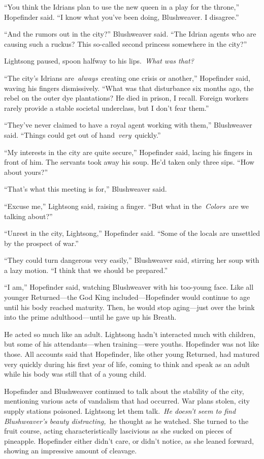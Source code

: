 “You think the Idrians plan to use the new queen in a play for the throne,” Hopefinder said. “I know what you’ve been doing, Blushweaver. I disagree.”

“And the rumors out in the city?” Blushweaver said. “The Idrian agents who are causing such a ruckus? This so-called second princess somewhere in the city?”

Lightsong paused, spoon halfway to his lips.~\textit{What was that?}

“The city’s Idrians are~\textit{always}~creating one crisis or another,” Hopefinder said, waving his fingers dismissively. “What was that disturbance six months ago, the rebel on the outer dye plantations? He died in prison, I recall. Foreign workers rarely provide a stable societal underclass, but I don’t fear them.”

“They’ve never claimed to have a royal agent working with them,” Blushweaver said. “Things could get out of hand~\textit{very}~quickly.”

“My interests in the city are quite secure,” Hopefinder said, lacing his fingers in front of him. The servants took away his soup. He’d taken only three sips. “How about yours?”

“That’s what this meeting is for,” Blushweaver said.

“Excuse me,” Lightsong said, raising a finger. “But what in the~\textit{Colors}~are we talking about?”

“Unrest in the city, Lightsong,” Hopefinder said. “Some of the locals are unsettled by the prospect of war.”

“They could turn dangerous very easily,” Blushweaver said, stirring her soup with a lazy motion. “I think that we should be prepared.”

“I am,” Hopefinder said, watching Blushweaver with his too-young face. Like all younger Returned—the God King included—Hopefinder would continue to age until his body reached maturity. Then, he would stop aging—just over the brink into the prime adulthood—until he gave up his Breath.

He acted so much like an adult. Lightsong hadn’t interacted much with children, but some of his attendants—when training—were youths. Hopefinder was not like those. All accounts said that Hopefinder, like other young Returned, had matured very quickly during his first year of life, coming to think and speak as an adult while his body was still that of a young child.

Hopefinder and Blushweaver continued to talk about the stability of the city, mentioning various acts of vandalism that had occurred. War plans stolen, city supply stations poisoned. Lightsong let them talk.~\textit{He doesn’t seem to find Blushweaver’s beauty distracting,}~he thought as he watched. She turned to the fruit course, acting characteristically lascivious as she sucked on pieces of pineapple. Hopefinder either didn’t care, or didn’t notice, as she leaned forward, showing an impressive amount of cleavage.

